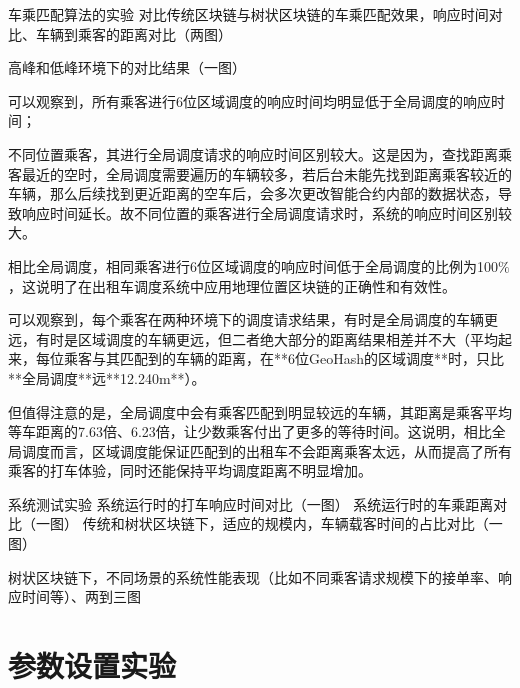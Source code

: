 车乘匹配算法的实验
  对比传统区块链与树状区块链的车乘匹配效果，响应时间对比、车辆到乘客的距离对比（两图）

  高峰和低峰环境下的对比结果（一图）

  可以观察到，所有乘客进行6位区域调度的响应时间均明显低于全局调度的响应时间；

  不同位置乘客，其进行全局调度请求的响应时间区别较大。这是因为，查找距离乘客最近的空时，全局调度需要遍历的车辆较多，若后台未能先找到距离乘客较近的车辆，那么后续找到更近距离的空车后，会多次更改智能合约内部的数据状态，导致响应时间延长。故不同位置的乘客进行全局调度请求时，系统的响应时间区别较大。

  相比全局调度，相同乘客进行6位区域调度的响应时间低于全局调度的比例为100$\%$，这说明了在出租车调度系统中应用地理位置区块链的正确性和有效性。


  可以观察到，每个乘客在两种环境下的调度请求结果，有时是全局调度的车辆更远，有时是区域调度的车辆更远，但二者绝大部分的距离结果相差并不大（平均起来，每位乘客与其匹配到的车辆的距离，在**6位GeoHash的区域调度**时，只比**全局调度**远**12.240m**）。

  但值得注意的是，全局调度中会有乘客匹配到明显较远的车辆，其距离是乘客平均等车距离的7.63倍、6.23倍，让少数乘客付出了更多的等待时间。这说明，相比全局调度而言，区域调度能保证匹配到的出租车不会距离乘客太远，从而提高了所有乘客的打车体验，同时还能保持平均调度距离不明显增加。



系统测试实验
  系统运行时的打车响应时间对比（一图）
  系统运行时的车乘距离对比（一图）
  传统和树状区块链下，适应的规模内，车辆载客时间的占比对比（一图）

  树状区块链下，不同场景的系统性能表现（比如不同乘客请求规模下的接单率、响应时间等）、两到三图





\section{参数设置实验}

